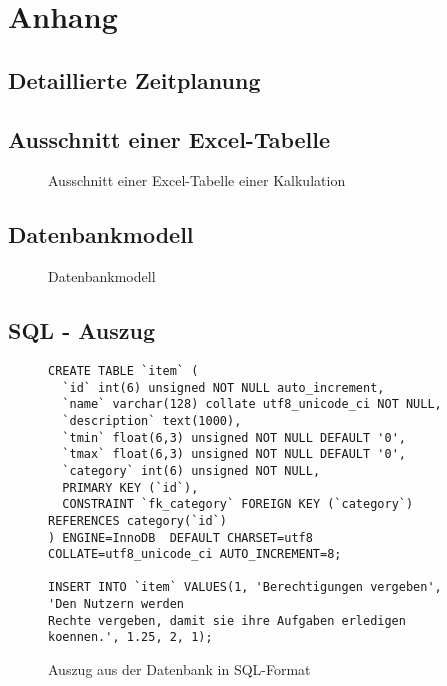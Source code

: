 \section{Anhang}
\subsection{Detaillierte Zeitplanung}
\label{app:Zeitplanung}
\clearpage


\clearpage

\subsection{Ausschnitt einer Excel-Tabelle}
\label{app:Exceltabelle}
\begin{figure}[htb]
\centering
{}
\caption{Ausschnitt einer Excel-Tabelle einer Kalkulation}
\end{figure}
\clearpage

\subsection{Datenbankmodell}
\label{app:Datenbankmodell}
\begin{figure}[htb]
\centering
{}
\caption{Datenbankmodell}
\end{figure}
\clearpage

\subsection{SQL - Auszug}
\label{app:SQL}
\begin{figure}[htb]
\begin{lstlisting}
CREATE TABLE `item` (
  `id` int(6) unsigned NOT NULL auto_increment,
  `name` varchar(128) collate utf8_unicode_ci NOT NULL,
  `description` text(1000),
  `tmin` float(6,3) unsigned NOT NULL DEFAULT '0',
  `tmax` float(6,3) unsigned NOT NULL DEFAULT '0',
  `category` int(6) unsigned NOT NULL,
  PRIMARY KEY (`id`),
  CONSTRAINT `fk_category` FOREIGN KEY (`category`) REFERENCES category(`id`)
) ENGINE=InnoDB  DEFAULT CHARSET=utf8 COLLATE=utf8_unicode_ci AUTO_INCREMENT=8;

INSERT INTO `item` VALUES(1, 'Berechtigungen vergeben', 'Den Nutzern werden
Rechte vergeben, damit sie ihre Aufgaben erledigen koennen.', 1.25, 2, 1);
\end{lstlisting}
\caption{Auszug aus der Datenbank in SQL-Format}
\end{figure}
\clearpage


\clearpage

\clearpage
